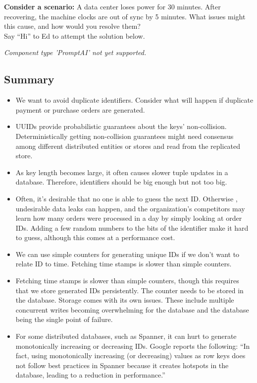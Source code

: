 \textbf{Consider a scenario:} A data center loses power for 30 minutes. After recovering, the machine clocks are out of sync by 5 minutes. What issues might this cause, and how would you resolve them?
\\
Say ``Hi'' to Ed to attempt the solution below.

\textit{Component type 'PromptAI' not yet supported.}

\subsection{Summary}\label{HDxZHswXMi2x_qH-Yf3z1}

\begin{itemize}
\item
\protect{}\label{jHrXwWI6X2qYfEKNtz2aT}
We want to avoid duplicate identifiers. Consider what will happen if duplicate payment or purchase orders are generated.
\item
\protect{}\label{VOh5yDHCK4jAp59X9siSv}
UUIDs provide probabilistic guarantees about the keys' non-collision. Deterministically getting non-collision guarantees might need consensus among different distributed entities or stores and read from the replicated store.
\item
\protect{}\label{luCQij4OzfnUWrBZx8Nmh}
As key length becomes large, it often causes slower tuple updates in a database. Therefore, identifiers should be big enough but not too big.
\item
\protect{}\label{xuITybZFllVbgBVDSTECe}
Often, it's desirable that no one is able to guess the next ID. Otherwise , undesirable data leaks can happen, and the organization's competitors may learn how many orders were processed in a day by simply looking at order IDs. Adding a few random numbers to the bits of the identifier make it hard to guess, although this comes at a performance cost.
\item
\protect{}\label{-oDE-VSVzZT0gDt6bn9TH}
We can use simple counters for generating unique IDs if we don't want to relate ID to time. Fetching time stamps is slower than simple counters.
\item
\protect{}\label{evlc89q4zr20gb0jbuU0O}
Fetching time stamps is slower than simple counters, though this requires that we store generated IDs persistently. The counter needs to be stored in the database. Storage comes with its own issues. These include multiple concurrent writes becoming overwhelming for the database and the database being the single point of failure.
\item
\protect{}\label{u_7x7aHUyQNiqP3LALfGV}
For some distributed databases, such as Spanner, it can hurt to generate monotonically increasing or decreasing IDs. Google reports the following: ``In fact, using monotonically increasing (or decreasing) values as row keys does not follow best practices in Spanner because it creates hotspots in the database, leading to a reduction in performance.''
\end{itemize}
